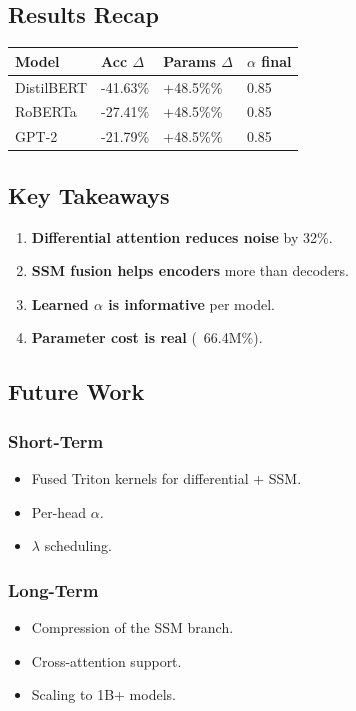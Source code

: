 \subsection{Results Recap}

\begin{table}[H]
\centering
\small
\begin{tabular}{llll}
\toprule
\textbf{Model} & \textbf{Acc $\Delta$} & \textbf{Params $\Delta$} & \textbf{$\alpha$ final} \\
\midrule
DistilBERT & -41.63\% & +48.5\%\% & 0.85 \\
RoBERTa & -27.41\% & +48.5\%\% & 0.85 \\
GPT-2 & -21.79\% & +48.5\%\% & 0.85 \\
\bottomrule
\end{tabular}
\end{table}

\subsection{Key Takeaways}

\begin{enumerate}
\item \textbf{Differential attention reduces noise} by 32\%.
\item \textbf{SSM fusion helps encoders} more than decoders.
\item \textbf{Learned $\alpha$ is informative} per model.
\item \textbf{Parameter cost is real} (~66.4M\%).

\end{enumerate}
\subsection{Future Work}

\subsubsection{Short-Term}
\begin{itemize}
\item Fused Triton kernels for differential + SSM.
\item Per-head $\alpha$.
\item $\lambda$ scheduling.

\end{itemize}
\subsubsection{Long-Term}
\begin{itemize}
\item Compression of the SSM branch.
\item Cross-attention support.
\item Scaling to 1B+ models.

\end{itemize}
